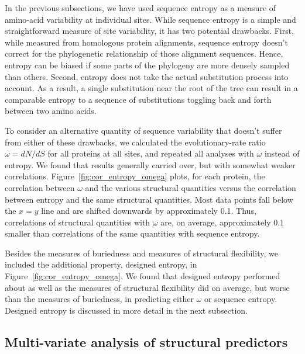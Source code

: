 \documentclass[smallextended]{svjour3}
\begin{document}
In the previous subsections, we have used sequence entropy as a measure of amino-acid variability at individual sites. While sequence entropy is a simple and straightforward measure of site variability, it has two potential drawbacks. First, while measured from homologous protein alignments, sequence entropy doesn't correct for the phylogenetic relationship of those alignment sequences. Hence, entropy can be biased if some parts of the phylogeny are more densely sampled than others. Second, entropy does not take the actual substitution process into account. As a result, a single substitution near the root of the tree can result in a comparable entropy to a sequence of substitutions toggling back and forth between two amino acids.

To consider an alternative quantity of sequence variability that doesn't suffer from either of these drawbacks, we calculated the evolutionary-rate ratio $\omega=dN/dS$ for all proteins at all sites, and repeated all analyses with $\omega$ instead of entropy. We found that results generally carried over, but with somewhat weaker correlations. Figure~\ref{fig:cor_entropy_omega} plots, for each protein, the correlation between $\omega$ and the various structural quantities versus the correlation between entropy and the same structural quantities. Most data points fall below the $x=y$ line and are shifted downwards by approximately 0.1. Thus, correlations of structural quantities with $\omega$ are, on average, approximately 0.1 smaller than correlations of the same quantities with sequence entropy.

Besides the measures of buriedness and measures of structural flexibility, we included the additional property, designed entropy, in Figure~\ref{fig:cor_entropy_omega}.  We found that designed entropy performed about as well as the measures of structural flexibility did on average, but worse than the measures of buriedness, in predicting either $\omega$ or sequence entropy. Designed entropy is discussed in more detail in the next subsection.

\subsection*{Multi-variate analysis of structural predictors}
\end{document}
